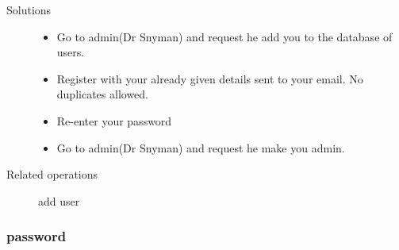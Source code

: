 \documentclass[14pt, a4paper]{article}
\begin{document}
\begin{description}
\item[Solutions]\hfill
\begin{itemize}
	\item Go to admin(Dr Snyman) and request he add you to the database of users.
	\item Register with your already given details sent to your email. No duplicates allowed.
	\item Re-enter your password
	\item  Go to admin(Dr Snyman) and request he make you admin.
\end{itemize}
\item[Related operations] add user
\end{description}
		   
\subsubsection{password}
\end{document}
